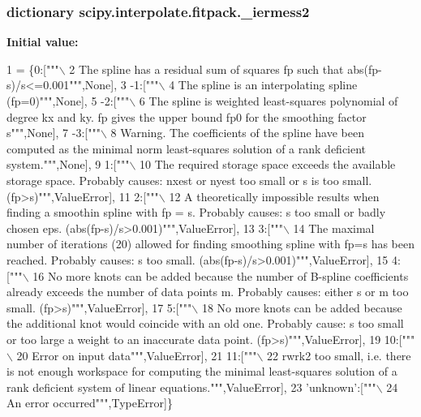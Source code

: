 \subsubsection[{\+\_\+iermess2}]{\setlength{\rightskip}{0pt plus 5cm}dictionary scipy.\+interpolate.\+fitpack.\+\_\+iermess2}\label{namespacescipy_1_1interpolate_1_1fitpack_a234ed1709b55f5bbbb71855eb4f4f140}
{\bfseries Initial value\+:}
\begin{DoxyCode}
1 = \{0:[\textcolor{stringliteral}{"""\(\backslash\)}
2 \textcolor{stringliteral}{    The spline has a residual sum of squares fp such that abs(fp-s)/s<=0.001"""},\textcolor{keywordtype}{None}],
3             -1:[\textcolor{stringliteral}{"""\(\backslash\)}
4 \textcolor{stringliteral}{    The spline is an interpolating spline (fp=0)"""},\textcolor{keywordtype}{None}],
5             -2:[\textcolor{stringliteral}{"""\(\backslash\)}
6 \textcolor{stringliteral}{    The spline is weighted least-squares polynomial of degree kx and ky.    fp gives the upper bound fp0
       for the smoothing factor s"""},\textcolor{keywordtype}{None}],
7             -3:[\textcolor{stringliteral}{"""\(\backslash\)}
8 \textcolor{stringliteral}{    Warning. The coefficients of the spline have been computed as the minimal    norm least-squares
       solution of a rank deficient system."""},\textcolor{keywordtype}{None}],
9             1:[\textcolor{stringliteral}{"""\(\backslash\)}
10 \textcolor{stringliteral}{    The required storage space exceeds the available storage space.    Probably causes: nxest or nyest too
       small or s is too small. (fp>s)"""},ValueError],
11             2:[\textcolor{stringliteral}{"""\(\backslash\)}
12 \textcolor{stringliteral}{    A theoretically impossible results when finding a smoothin spline    with fp = s. Probably causes: s
       too small or badly chosen eps.    (abs(fp-s)/s>0.001)"""},ValueError],
13             3:[\textcolor{stringliteral}{"""\(\backslash\)}
14 \textcolor{stringliteral}{    The maximal number of iterations (20) allowed for finding smoothing    spline with fp=s has been
       reached. Probably causes: s too small.    (abs(fp-s)/s>0.001)"""},ValueError],
15             4:[\textcolor{stringliteral}{"""\(\backslash\)}
16 \textcolor{stringliteral}{    No more knots can be added because the number of B-spline coefficients    already exceeds the number of
       data points m. Probably causes: either    s or m too small. (fp>s)"""},ValueError],
17             5:[\textcolor{stringliteral}{"""\(\backslash\)}
18 \textcolor{stringliteral}{    No more knots can be added because the additional knot would coincide    with an old one. Probably
       cause: s too small or too large a weight    to an inaccurate data point. (fp>s)"""},ValueError],
19             10:[\textcolor{stringliteral}{"""\(\backslash\)}
20 \textcolor{stringliteral}{    Error on input data"""},ValueError],
21             11:[\textcolor{stringliteral}{"""\(\backslash\)}
22 \textcolor{stringliteral}{    rwrk2 too small, i.e. there is not enough workspace for computing    the minimal least-squares solution
       of a rank deficient system of linear    equations."""},ValueError],
23             \textcolor{stringliteral}{'unknown'}:[\textcolor{stringliteral}{"""\(\backslash\)}
24 \textcolor{stringliteral}{    An error occurred"""},TypeError]\}
\end{DoxyCode}
